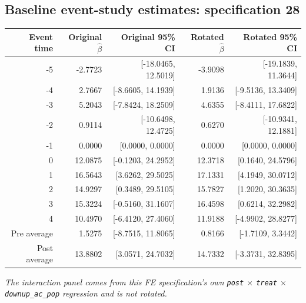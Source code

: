 \documentclass[10pt]{article}
\begin{document}
\subsection*{Baseline event-study estimates: specification 28}
\begin{center}
\scriptsize
\begin{tabular}{r rr rr}
\toprule
Event time & Original $\hat\beta$ & Original 95\% CI & Rotated $\hat\beta$ & Rotated 95\% CI \\
\midrule
-5 & -2.7723 & [-18.0465, 12.5019] & -3.9098 & [-19.1839, 11.3644] \\
-4 & 2.7667 & [-8.6605, 14.1939] & 1.9136 & [-9.5136, 13.3409] \\
-3 & 5.2043 & [-7.8424, 18.2509] & 4.6355 & [-8.4111, 17.6822] \\
-2 & 0.9114 & [-10.6498, 12.4725] & 0.6270 & [-10.9341, 12.1881] \\
-1 & 0.0000 & [0.0000, 0.0000] & 0.0000 & [0.0000, 0.0000] \\
0 & 12.0875 & [-0.1203, 24.2952] & 12.3718 & [0.1640, 24.5796] \\
1 & 16.5643 & [3.6262, 29.5025] & 17.1331 & [4.1949, 30.0712] \\
2 & 14.9297 & [0.3489, 29.5105] & 15.7827 & [1.2020, 30.3635] \\
3 & 15.3224 & [-0.5160, 31.1607] & 16.4598 & [0.6214, 32.2982] \\
4 & 10.4970 & [-6.4120, 27.4060] & 11.9188 & [-4.9902, 28.8277] \\
\midrule
Pre average & 1.5275 & [-8.7515, 11.8065] & 0.8166 & [-1.7109, 3.3442] \\
Post average & 13.8802 & [3.0571, 24.7032] & 14.7332 & [-3.3731, 32.8395] \\
\bottomrule
\end{tabular}
\end{center}
\medskip
\textit{The interaction panel comes from this FE specification's own \texttt{post} $\times$ \texttt{treat} $\times$ \texttt{downup\_ac\_pop} regression and is not rotated.}
\clearpage
\end{document}
